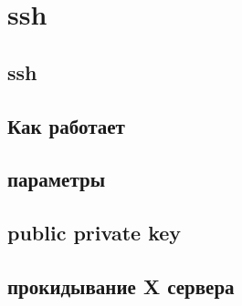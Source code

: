 \section{ssh}
\subsection{ssh}
\subsection{Как работает}
\subsection{параметры}
\subsection{public private key}
\subsection{прокидывание X сервера} 
\newpage